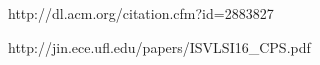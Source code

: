 http://dl.acm.org/citation.cfm?id=2883827

http://jin.ece.ufl.edu/papers/ISVLSI16_CPS.pdf

\fi




































